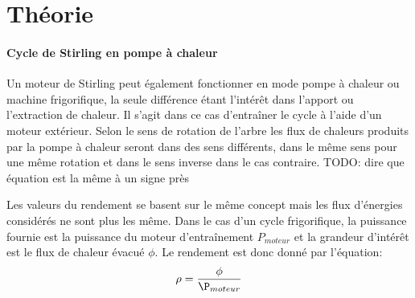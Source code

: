 \section{Théorie}






\paragraph*{Cycle de Stirling en pompe à chaleur}
Un moteur de Stirling peut également fonctionner en mode pompe à chaleur ou machine frigorifique, la seule différence étant l'intérêt dans l'apport ou l'extraction de chaleur. Il s'agit dans ce cas d'entraîner le cycle à l'aide d'un moteur extérieur. Selon le sens de rotation de l'arbre les flux de chaleurs produits par la pompe à chaleur seront dans des sens différents, dans le même sens pour une même rotation et dans le sens inverse dans le cas contraire. TODO: dire que équation est la même à un signe près

Les valeurs du rendement se basent sur le même concept mais les flux d'énergies considérés ne sont plus les même. Dans le cas d'un cycle frigorifique, la puissance fournie est la puissance du moteur d'entraînement \(P_{moteur}\) et la grandeur d'intérêt est le flux de chaleur évacué \(\phi\). Le rendement est donc donné par l'équation:
\begin{equation}
    \rho = \frac{\phi}{\P_{moteur}}
    \label{eq:rend-frigo}
\end{equation}